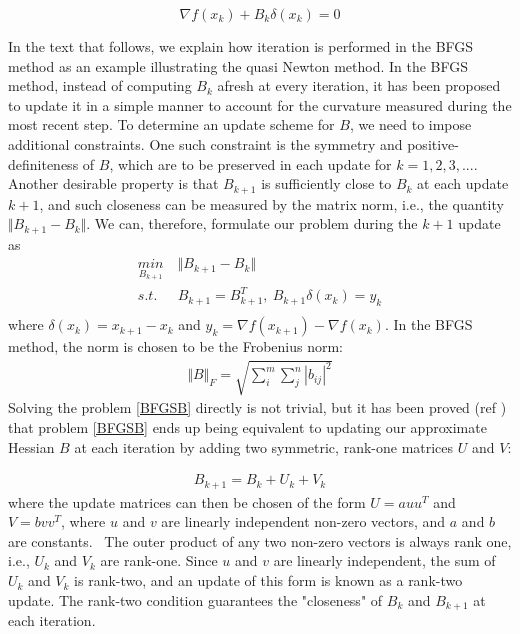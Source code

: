 \documentclass  [
  paper    = a4,
  BCOR     = 10mm,
  twoside,
  fontsize = 12pt,
  fleqn,
  toc      = bibnumbered,
  toc      = listofnumbered,
  numbers  = noendperiod,
  headings = normal,
  listof   = leveldown,
  version  = 3.03
]                                       {scrreprt}
\newcommand{\<}{\langle}
\renewcommand{\>}{\rangle}
\begin{document}
\begin{equation}
	\nabla f(x_k) +B_k\delta(x_k) =0
	\label{HessianAppro}
\end{equation}

In the text that follows, we explain how iteration is performed in the BFGS method as an example illustrating the quasi Newton method. In the BFGS method, instead of computing $B_k$ afresh at every iteration, it has been proposed to update it in a simple manner to account for the curvature measured during the most recent step. To determine an update scheme for $B$, we need to impose additional constraints. One such constraint is the symmetry and positive-definiteness of $B$, which are to be preserved in each update for $k = 1,2, 3, ...$. Another desirable property is that $B_{k+1}$ is sufficiently close to $B_k$ at each update $k+1$, and such closeness can be measured by the matrix norm, i.e., the quantity $\Vert B_{k+1} - B_{k} \Vert$. We can, therefore, formulate our problem during the $k+1$ update as 
\begin{equation}
	\begin{aligned}
		\underset{B_{k+1}}{min} \  &  \Vert B_{k+1} - B_{k} \Vert\\
		s.t.\ \  & B_{k+1}= B_{k+1}^T, \ B_{k+1}\delta(x_k)  = y_k \\
	\end{aligned}
	\label{BFGSB}
\end{equation}
where $\delta(x_k) = x_{k+1} -x_k$ and $y_k = \nabla f(x_{k+1}) - \nabla f(x_k)$. In the BFGS method, the norm is chosen to be the Frobenius norm:
\begin{align*}
	\Vert B \Vert_F = \sqrt{\sum_{i}^{m} \sum_{j}^{n} |b_{ij}|^2} 
\end{align*}
Solving the problem \ref{BFGSB} directly is not trivial, but it has been proved (ref \cite{JorSte06}) that problem  \ref{BFGSB} ends up being equivalent to updating our approximate Hessian $B$ at each iteration by adding two symmetric, rank-one matrices $U$ and $V$:

\begin{align*}
	B_{k+1} = B_k + U_k + V_k
\end{align*}
where the update matrices can then be chosen of the form $U = a u u^T$ and $V = b v v^T$, where $u$ and $v$ are linearly independent non-zero vectors, and $a$ and $b$ are constants.  The outer product of any two non-zero vectors is always rank one, i.e., $U_k$ and $V_k$ are rank-one. Since $u$ and $v$ are linearly independent, the sum of $U_k$ and $V_k$ is rank-two, and an update of this form is known as a rank-two update. The rank-two condition guarantees the "closeness" of $B_k$ and $B_{k+1}$ at each iteration.
\end{document}
